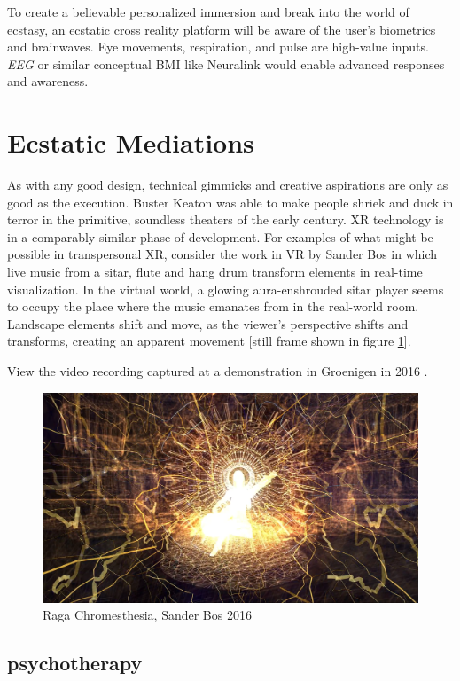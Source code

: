 \documentclass{UIdahoMastersThesis}
\begin{document}
To create a believable personalized immersion and break into the world of ecstasy, an ecstatic cross reality platform will be aware of the user's biometrics and brainwaves. Eye movements, respiration, and pulse are high-value inputs. \textit{\ac{EEG}} or similar conceptual \ac{BMI} like Neuralink would enable advanced responses and awareness.

\section{Ecstatic Mediations}

As with any good design, technical gimmicks and creative aspirations are only as good as the execution. Buster Keaton was able to make people shriek and duck in terror in the primitive, soundless theaters of the early  century. \ac{XR} technology is in a comparably similar phase of development. For examples of what might be possible in transpersonal \ac{XR}, consider the work in \ac{VR} by Sander Bos in which live music from a sitar, flute and hang drum transform elements in real-time visualization. In the virtual world, a glowing aura-enshrouded sitar player seems to occupy the place where the music emanates from in the real-world room. Landscape elements shift and move, as the viewer's perspective shifts and transforms, creating an apparent movement [still frame shown in figure \ref{fig:bos}].

View the video recording captured at a demonstration in Groenigen in 2016 \cite{noauthor_raga_nodate}.

\begin{figure}[h!]
	\centering
	\includegraphics[width=0.81\linewidth]{bos.png}
	\caption{Raga Chromesthesia, Sander Bos 2016}
	\label{fig:bos}
\end{figure}

\subsection{psychotherapy}
\end{document}
